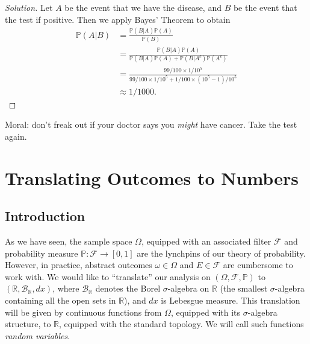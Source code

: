 \documentclass[12pt]{article}
\newcommand{\rr}{\mathbb{R}}
\newcommand{\filter}{\mathcal{F}}
\newcommand{\borel}{\mathcal{B}}
\newcommand{\prob}{\mathbb{P}}
\theoremstyle{plain}
\theoremstyle{definition}
\theoremstyle{remark}
\numberwithin{equation}{section}  %
\begin{document}
\begin{proof}[Solution]
Let $A$ be the event that we have the disease, and $B$ be the event
that the test if positive. Then we apply
Bayes' Theorem to obtain
\begin{align*}
\prob(A | B) & = \frac{\prob(B | A) \prob(A)}{\prob(B)}
\\
& = \frac{\prob(B | A) \prob(A)}{\prob(B|A) \prob(A) + \prob(B | A^c)
\prob(A^c)}
\\
& = \frac{99/100 \times 1/10^5}{99/100 \times 1/10^5 + 1/100 \times (10^5 -
1)/10^5}
\\
& \approx 1/1000.
\end{align*}
\end{proof}
Moral: don't freak out if your doctor says you \emph{might} have
cancer. Take the test again.
\section{Translating Outcomes to Numbers}
\subsection{Introduction}
As we have seen, the sample space $\Omega$, equipped with an associated filter
$\filter$ and probability measure $\prob: \filter \to [0,1]$ 
are the lynchpins of our theory of probability. However, in practice,
abstract outcomes $\omega \in \Omega$ and $E \in \filter$ are
cumbersome to work with. We would like to ``translate'' our analysis
on $(\Omega, \filter, \prob)$ to $(\rr, \borel_{\rr}, dx)$,
where $\borel_{\rr}$ denotes the Borel $\sigma$-algebra on $\rr$ (the smallest 
$\sigma$-algebra containing all the open sets in $\rr$), and $dx$ is
Lebesgue measure. This translation will be given by continuous functions from
$\Omega$, equipped with its $\sigma$-algebra structure, to $\rr$,
equipped with the standard topology. We will call such functions 
\emph{random variables}.
\end{document}
